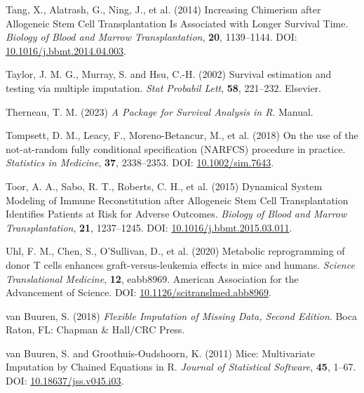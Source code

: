 \documentclass[
  letterpaper,
  paper=240mm:170mm,
  twoside=true,
  open=right,
  fontsize=10pt,
  pagesize=false,
  BCOR=15mm,
  DIV=14,
  headinclude=true,
  footinclude=false,
  headsepline=on]{scrbook}
\newlength{\cslhangindent}
\newenvironment{CSLReferences}[2] %
 {\begin{list}{}{%
  \setlength{\itemindent}{0pt}
  \setlength{\leftmargin}{0pt}
  \setlength{\parsep}{0pt}
  \ifodd #1
   \setlength{\leftmargin}{\cslhangindent}
   \setlength{\itemindent}{-1\cslhangindent}
  \fi
  \setlength{\itemsep}{#2\baselineskip}}}
 {\end{list}}
\begin{document}
\begin{CSLReferences}{1}{1}
Tang, X., Alatrash, G., Ning, J., et al. (2014) Increasing {Chimerism}
after {Allogeneic Stem Cell Transplantation Is Associated} with {Longer
Survival Time}. \emph{Biology of Blood and Marrow Transplantation},
\textbf{20}, 1139--1144. DOI:
\href{https://doi.org/10.1016/j.bbmt.2014.04.003}{10.1016/j.bbmt.2014.04.003}.

Taylor, J. M. G., Murray, S. and Hsu, C.-H. (2002) Survival estimation
and testing via multiple imputation. \emph{Stat Probabil Lett},
\textbf{58}, 221--232. Elsevier.

Therneau, T. M. (2023) \emph{A Package for Survival Analysis in {R}}.
Manual.

Tompsett, D. M., Leacy, F., Moreno-Betancur, M., et al. (2018) On the
use of the not-at-random fully conditional specification ({NARFCS})
procedure in practice. \emph{Statistics in Medicine}, \textbf{37},
2338--2353. DOI:
\href{https://doi.org/10.1002/sim.7643}{10.1002/sim.7643}.

Toor, A. A., Sabo, R. T., Roberts, C. H., et al. (2015) Dynamical
{System Modeling} of {Immune Reconstitution} after {Allogeneic Stem Cell
Transplantation Identifies Patients} at {Risk} for {Adverse Outcomes}.
\emph{Biology of Blood and Marrow Transplantation}, \textbf{21},
1237--1245. DOI:
\href{https://doi.org/10.1016/j.bbmt.2015.03.011}{10.1016/j.bbmt.2015.03.011}.

Uhl, F. M., Chen, S., O'Sullivan, D., et al. (2020) Metabolic
reprogramming of donor {T} cells enhances graft-versus-leukemia effects
in mice and humans. \emph{Science Translational Medicine}, \textbf{12},
eabb8969. American Association for the Advancement of Science. DOI:
\href{https://doi.org/10.1126/scitranslmed.abb8969}{10.1126/scitranslmed.abb8969}.

van Buuren, S. (2018) \emph{Flexible {Imputation} of {Missing Data},
{Second Edition}}. Boca Raton, FL: Chapman \& Hall/CRC Press.

van Buuren, S. and Groothuis-Oudshoorn, K. (2011) Mice: {Multivariate
Imputation} by {Chained Equations} in {R}. \emph{Journal of Statistical
Software}, \textbf{45}, 1--67. DOI:
\href{https://doi.org/10.18637/jss.v045.i03}{10.18637/jss.v045.i03}.


\end{CSLReferences}
\end{document}
